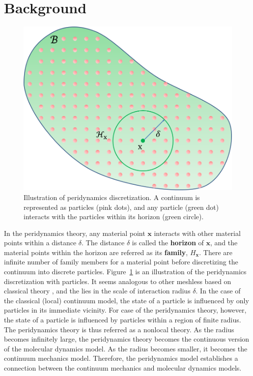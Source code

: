 \section{Background}\label{section:3}

\begin{figure}[t]
  \centering
  \includegraphics[width=0.7\linewidth, bb=0 0 440 355]{../figs/peridynamics_circle.png}
  \caption{\label{fig:2}
  Illustration of peridynamics discretization. A continuum is represented as particles (pink dots), and any particle (green dot) interacts with the particles within its horizon (green circle).
}
\end{figure}
In the peridynamics theory, any material point $\mathbf{x}$ interacts with other material points within a distance $\delta$. The distance $\delta$ is called the \textbf{horizon} of $\mathbf{x}$, and the material points within the horizon are referred as its \textbf{family}, $H_\mathbf{x}$. There are infinite number of family members for a material point before discretizing the continuum into discrete particles. Figure~\ref{fig:2} is an illustration of the peridynamics discretization with particles. It seems analogous to other meshless  based on classical theory \cite{Muller:2003:PFS:846276.846298,Muller:2004:PBA:1028523.1028542}, and the  lies in the scale of interaction radius $\delta$. In the case of the classical (local) continuum model, the state of a particle is influenced by only particles in its immediate vicinity. For case of the peridynamics theory, however, the state of a particle is influenced by particles within a region of finite radius. The peridynamics theory is thus referred as a nonlocal theory. As the radius becomes infinitely large, the peridynamics theory becomes the continuous version of the molecular dynamics model. As the radius becomes smaller, it becomes the continuum mechanics model. Therefore, the peridynamics model establishes a connection between the continuum mechanics and molecular dynamics models.

